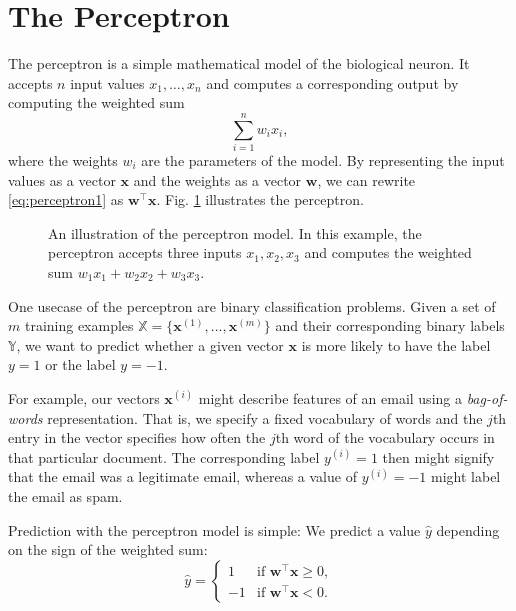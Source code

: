 \section{The Perceptron}
\label{sec:perceptron}
The perceptron\cite{McCulloch1943115} is a simple mathematical model of the biological neuron. It accepts $n$ input values $x_1, \ldots, x_n$ and computes a corresponding output by computing the weighted sum
\begin{equation}\label{eq:perceptron1}
	\sum_{i=1}^{n} w_ix_i,
\end{equation}
where the weights $w_i$ are the parameters of the model.
By representing the input values as a vector $\bm{x}$ and the weights as a vector $\bm{w}$, we can rewrite \eqref{eq:perceptron1} as $\bm{w}^\top\bm{x}$. Fig. \ref{fig:perceptron} illustrates the perceptron.

\begin{figure}
	\begin{center}
		
	\end{center}
	\caption{An illustration of the perceptron model. In this example, the perceptron accepts three inputs $x_1, x_2, x_3$ and computes the weighted sum $w_1x_1 + w_2x_2 + w_3x_3.$}
	\label{fig:perceptron}
\end{figure}

One usecase of the perceptron are binary classification problems. Given a set of $m$ training examples $\mathbb{X} = \{\bm{x}^{(1)}, \ldots, \bm{x}^{(m)}\}$ and their corresponding binary labels $\mathbb{Y}$, we want to predict whether a given vector $\bm{x}$ is more likely to have the label $y = 1$ or the label $y = -1$.

For example, our vectors $\bm{x}^{(i)}$ might describe features of an email using a \emph{bag-of-words} representation. That is, we specify a fixed vocabulary of words and the $j$th entry in the vector specifies how often the $j$th word of the vocabulary occurs in that particular document. The corresponding label $y^{(i)} = 1$ then might signify that the email was a legitimate email, whereas a value of $y^{(i)} = -1$ might label the email as spam.

Prediction with the perceptron model is simple: We predict a value $\hat{y}$ depending on the sign of the weighted sum:
\begin{equation}
\hat{y} = \begin{cases} 1 & \text{if }\bm{w}^{\top}\bm{x} \geq 0,
					  \\-1 & \text{if }\bm{w}^{\top}\bm{x} < 0.
		  \end{cases}
\end{equation}

